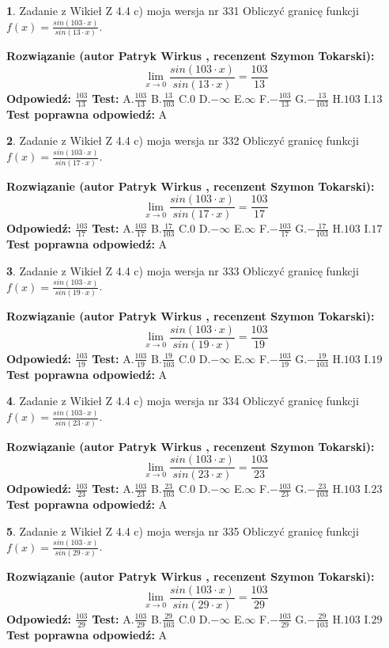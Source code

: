 \documentclass[12pt, a4paper]{article}
\theoremstyle{definition} %
\newtheorem{zad}{}
\newcommand{\zadStart}[1]{\begin{zad}#1\newline}
\newcommand{\zadStop}{\end{zad}}
\newcommand{\rozwStart}[2]{\noindent \textbf{Rozwiązanie (autor #1 , recenzent #2): }\newline}
\newcommand{\rozwStop}{\newline}
\newcommand{\odpStart}{\noindent \textbf{Odpowiedź:}\newline}
\newcommand{\odpStop}{\newline}
\newcommand{\testStart}{\noindent \textbf{Test:}\newline}
\newcommand{\testStop}{\newline}
\newcommand{\kluczStart}{\noindent \textbf{Test poprawna odpowiedź:}\newline}
\newcommand{\kluczStop}{\newline}
\begin{document}
\zadStart{Zadanie z Wikieł Z 4.4 c) moja wersja nr 331}
Obliczyć granicę funkcji $f(x)=\frac{sin(103\cdot x)}{sin(13\cdot x)}$.
\zadStop
\rozwStart{Patryk Wirkus}{Szymon Tokarski}
$$\lim\limits_{x\to 0}\frac{sin(103\cdot x)}{sin(13\cdot x)}=
\frac{103}{13}$$
\rozwStop
\odpStart
$\frac{103}{13}$
\odpStop
\testStart
A.$\frac{103}{13}$
B.$\frac{13}{103}$
C.$0$
D.$-\infty$
E.$\infty$
F.$-\frac{103}{13}$
G.$-\frac{13}{103}$
H.$103$
I.$13$
\testStop
\kluczStart
A
\kluczStop



\zadStart{Zadanie z Wikieł Z 4.4 c) moja wersja nr 332}
Obliczyć granicę funkcji $f(x)=\frac{sin(103\cdot x)}{sin(17\cdot x)}$.
\zadStop
\rozwStart{Patryk Wirkus}{Szymon Tokarski}
$$\lim\limits_{x\to 0}\frac{sin(103\cdot x)}{sin(17\cdot x)}=
\frac{103}{17}$$
\rozwStop
\odpStart
$\frac{103}{17}$
\odpStop
\testStart
A.$\frac{103}{17}$
B.$\frac{17}{103}$
C.$0$
D.$-\infty$
E.$\infty$
F.$-\frac{103}{17}$
G.$-\frac{17}{103}$
H.$103$
I.$17$
\testStop
\kluczStart
A
\kluczStop



\zadStart{Zadanie z Wikieł Z 4.4 c) moja wersja nr 333}
Obliczyć granicę funkcji $f(x)=\frac{sin(103\cdot x)}{sin(19\cdot x)}$.
\zadStop
\rozwStart{Patryk Wirkus}{Szymon Tokarski}
$$\lim\limits_{x\to 0}\frac{sin(103\cdot x)}{sin(19\cdot x)}=
\frac{103}{19}$$
\rozwStop
\odpStart
$\frac{103}{19}$
\odpStop
\testStart
A.$\frac{103}{19}$
B.$\frac{19}{103}$
C.$0$
D.$-\infty$
E.$\infty$
F.$-\frac{103}{19}$
G.$-\frac{19}{103}$
H.$103$
I.$19$
\testStop
\kluczStart
A
\kluczStop



\zadStart{Zadanie z Wikieł Z 4.4 c) moja wersja nr 334}
Obliczyć granicę funkcji $f(x)=\frac{sin(103\cdot x)}{sin(23\cdot x)}$.
\zadStop
\rozwStart{Patryk Wirkus}{Szymon Tokarski}
$$\lim\limits_{x\to 0}\frac{sin(103\cdot x)}{sin(23\cdot x)}=
\frac{103}{23}$$
\rozwStop
\odpStart
$\frac{103}{23}$
\odpStop
\testStart
A.$\frac{103}{23}$
B.$\frac{23}{103}$
C.$0$
D.$-\infty$
E.$\infty$
F.$-\frac{103}{23}$
G.$-\frac{23}{103}$
H.$103$
I.$23$
\testStop
\kluczStart
A
\kluczStop



\zadStart{Zadanie z Wikieł Z 4.4 c) moja wersja nr 335}
Obliczyć granicę funkcji $f(x)=\frac{sin(103\cdot x)}{sin(29\cdot x)}$.
\zadStop
\rozwStart{Patryk Wirkus}{Szymon Tokarski}
$$\lim\limits_{x\to 0}\frac{sin(103\cdot x)}{sin(29\cdot x)}=
\frac{103}{29}$$
\rozwStop
\odpStart
$\frac{103}{29}$
\odpStop
\testStart
A.$\frac{103}{29}$
B.$\frac{29}{103}$
C.$0$
D.$-\infty$
E.$\infty$
F.$-\frac{103}{29}$
G.$-\frac{29}{103}$
H.$103$
I.$29$
\testStop
\kluczStart
A
\kluczStop
\end{document}
